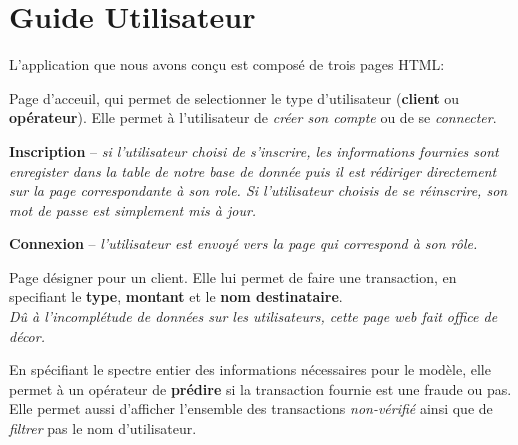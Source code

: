 \chapter{Guide Utilisateur}
    L'application que nous avons conçu est composé de trois pages HTML:

    \begin{orangebox}
        Page d'acceuil, qui permet de selectionner le type d'utilisateur (\textbf{client} ou \textbf{opérateur}). Elle permet à l'utilisateur de \emph{créer son compte} ou de se \emph{connecter}.
        \\
        \begin{bullet-enum}[itemsep=0pt]
            \item \textbf{Inscription} -- \emph{si l'utilisateur choisi de s'inscrire, les informations fournies sont enregister dans la table}  \emph{de notre base de donnée puis il est rédiriger directement sur la page correspondante à son role.
            Si l'utilisateur choisis de se réinscrire, son mot de passe est simplement mis à jour.}
            \item \textbf{Connexion} -- \emph{l'utilisateur est envoyé vers la page qui correspond à son rôle.}
        \end{bullet-enum}
    \end{orangebox}

    \begin{orangebox}
        Page désigner pour un client. Elle lui permet de faire une transaction, en specifiant le \textbf{type}, \textbf{montant} et le \textbf{nom destinataire}. \\[2mm]
        \emph{Dû à l'incomplétude de données sur les utilisateurs, cette page web fait office de décor.}
    \end{orangebox}

    \begin{orangebox}
        En spécifiant le spectre entier des informations nécessaires pour le modèle, elle permet à un opérateur de \textbf{prédire} si la transaction fournie est une fraude ou pas. Elle permet aussi d'afficher l'ensemble des transactions \emph{non-vérifié} ainsi que de \emph{filtrer} pas le nom d'utilisateur.
    \end{orangebox}
